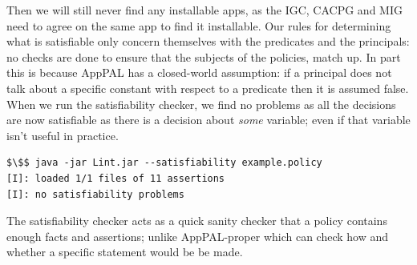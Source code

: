 \documentclass[thesis.tex]{subfiles}
\begin{document}
Then we will still never find any installable apps, as the \ac{IGC}, \ac{CACPG}
and \ac{MIG} need to agree on the same app to find it installable. Our rules for
determining what is satisfiable only concern themselves with the predicates and
the principals: no checks are done to ensure that the subjects of the policies,
match up. In part this is because AppPAL has a closed-world assumption: if a
principal does not talk about a specific constant with respect to a predicate
then it is assumed false. When we run the satisfiability checker, we find no
problems as all the decisions are now satisfiable as there is a decision about
\emph{some} variable; even if that variable isn't useful in practice.

\noindent\begin{minipage}{\linewidth}
\begin{lstlisting}
$\$$ java -jar Lint.jar --satisfiability example.policy
[I]: loaded 1/1 files of 11 assertions
[I]: no satisfiability problems
\end{lstlisting}
\end{minipage}

The satisfiability checker acts as a quick sanity checker that a policy contains
enough facts and assertions; unlike AppPAL-proper which can check how and
whether a specific statement would be be made.  

%
\end{document}
